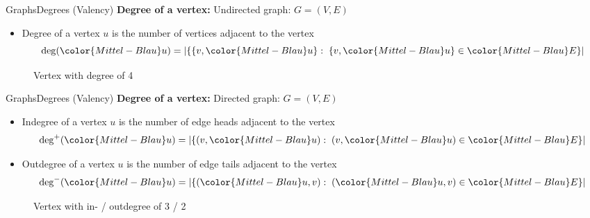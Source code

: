 \begin{frame}{Graphs}{Degrees (Valency)}
  \textbf{Degree of a vertex:} Undirected graph:
  {\color{Mittel-Blau}$G = (V , E)$}
  \begin{itemize}
    \item<2->
      {\color{Mittel-Blau}Degree} of a vertex {\color{Mittel-Blau}$u$}
      is the number of {\color{Mittel-Blau}vertices} adjacent to the
      vertex
      \begin{displaymath}
        \mathrm{deg}({\color{Mittel-Blau}u}) =
        \left\vert \{
          \{v, {\color{Mittel-Blau}u}\}
          : \; \{v, {\color{Mittel-Blau}u}\} \in {\color{Mittel-Blau}E} \} 
        \right\vert
      \end{displaymath}
  \end{itemize}
  \begin{figure}
    \begin{adjustbox}{width=0.325\linewidth}
      
    \end{adjustbox}
    \caption{Vertex with degree of 4}
    \label{fig:graph:degree_undirected}
  \end{figure}
\end{frame}


\begin{frame}{Graphs}{Degrees (Valency)}
  \textbf{Degree of a vertex:} Directed graph:
  {\color{Mittel-Blau}$G = (V , E)$}
  \begin{itemize}
    \item<2->
     {\color{Mittel-Blau}Indegree} of a vertex {\color{Mittel-Blau}$u$}
     is the number of {\color{Mittel-Blau}edge heads} adjacent to the
     vertex
     \begin{displaymath}
       \mathrm{deg}^{+}({\color{Mittel-Blau}u}) =
       \left\vert \{
         (v, {\color{Mittel-Blau}u})
         : \; (v, {\color{Mittel-Blau}u}) \in {\color{Mittel-Blau}E} \} 
       \right\vert
      \end{displaymath}
    \item<3->
      {\color{Mittel-Blau}Outdegree} of a vertex {\color{Mittel-Blau}$u$}
      is the number of {\color{Mittel-Blau}edge tails} adjacent to the
      vertex
      \begin{displaymath}
        \mathrm{deg}^{-}({\color{Mittel-Blau}u}) =
        \left\vert \{
          ({\color{Mittel-Blau}u}, v)
          : \; ({\color{Mittel-Blau}u}, v) \in {\color{Mittel-Blau}E} \}
        \right\vert
      \end{displaymath}
  \end{itemize}
  \begin{figure}
    \begin{adjustbox}{width=0.325\linewidth}
      
    \end{adjustbox}
    \caption{Vertex with in- / outdegree of 3 / 2}
    \label{fig:graph:degree_directed}
  \end{figure}
\end{frame}

